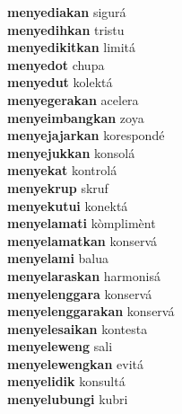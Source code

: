 \textbf{menyediakan } sigurá \\
\textbf{menyedihkan } tristu \\
\textbf{menyedikitkan } limitá \\
\textbf{menyedot } chupa \\
\textbf{menyedut } kolektá \\
\textbf{menyegerakan } acelera \\
\textbf{menyeimbangkan } zoya \\
\textbf{menyejajarkan } korespondé \\
\textbf{menyejukkan } konsolá \\
\textbf{menyekat } kontrolá \\
\textbf{menyekrup } skruf \\
\textbf{menyekutui } konektá \\
\textbf{menyelamati } kòmplimènt \\
\textbf{menyelamatkan } konservá \\
\textbf{menyelami } balua \\
\textbf{menyelaraskan } harmonisá \\
\textbf{menyelenggara } konservá \\
\textbf{menyelenggarakan } konservá \\
\textbf{menyelesaikan } kontesta \\
\textbf{menyeleweng } sali \\
\textbf{menyelewengkan } evitá \\
\textbf{menyelidik } konsultá \\
\textbf{menyelubungi } kubri \\
